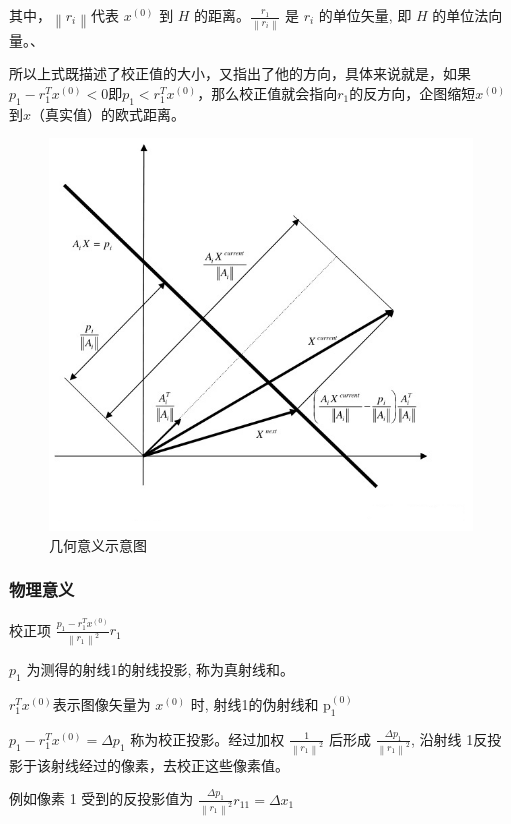 \documentclass[hyperref]{ctexart}
\begin{document}
				其中，$\left\|r_{i}\right\|$代表 $x^{(0)}$ 到 $H$ 的距离。$\frac{r_{1}}{\left\|r_{i}\right\|}$ 是 $r_{i}$ 的单位矢量, 即 $H$ 的单位法向量。、

				所以上式既描述了校正值的大小，又指出了他的方向，具体来说就是，如果$p_{1}-r_{1}^{T} x^{(0)}<0$即$p_{1}<r_{1}^{T} x^{(0)}$，那么校正值就会指向$r_{1}$的反方向，企图缩短$x^{(0)}$到$x$（真实值）的欧式距离。
				\begin{figure}[ht!]
				\centering
				\includegraphics[width=120mm]{ART_geo.png}
				\caption{几何意义示意图 \label{几何意义示意图}}
				\end{figure}

			\subsubsection{物理意义}
				
				校正项 $\frac{p_{1}-r_{1}^{T} x^{(0)}}{\left\|r_{1}\right\|^{2}} r_{1}$

				$p_{1}$ 为测得的射线1的射线投影, 称为真射线和。

				$r_{1}^{T} x^{(0)}$表示图像矢量为 $x^{(0)}$ 时, 射线1的伪射线和 $\mathrm{p}_{1}^{(0)}$ 

				$p_{1}-r_{1}^{T} x^{(0)}=\Delta p_{1}$ 称为校正投影。经过加权 $\frac{1}{\left\|r_{1}\right\|^{2}}$ 后形成 $\frac{\Delta p_{1}}{\left\|r_{1}\right\|^{2}}$, 沿射线 1反投影于该射线经过的像素，去校正这些像素值。 

				例如像素 1 受到的反投影值为 $\frac{\Delta p_{1}}{\left\|r_{1}\right\|^{2}} r_{11}=\Delta x_{1}$
\end{document}
